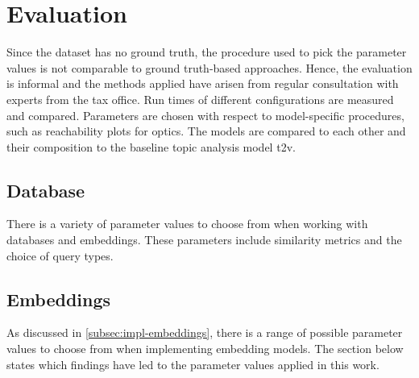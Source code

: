 \chapter{Evaluation}\label{ch:evaluation}

Since the dataset has no ground truth, the procedure used to pick the parameter values is not comparable to ground truth-based approaches.
Hence, the evaluation is informal and the methods applied have arisen from regular consultation with experts from the tax office.
Run times of different configurations are measured and compared.
Parameters are chosen with respect to model-specific procedures, such as reachability plots for \ac{optics}.
The models are compared to each other and their composition to the baseline topic analysis model \ac{t2v}.


 \section{Database}\label{sec:eval-db}
There is a variety of parameter values to choose from when working with databases and embeddings.
These parameters include similarity metrics and the choice of query types.

 

 

 
 
\section{Embeddings}\label{sec:eval-embeddings}
As discussed in \autoref{subsec:impl-embeddings}, there is a range of possible parameter values to choose from when implementing embedding models.
The section below states which findings have led to the parameter values applied in this work.















